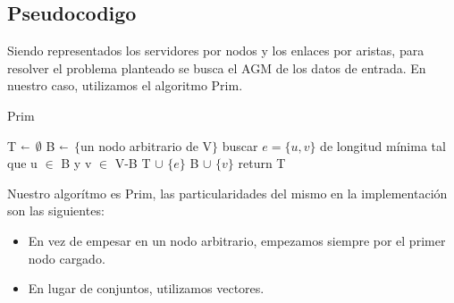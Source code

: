 \subsection{Pseudocodigo}

Siendo representados los servidores por nodos y los enlaces por aristas, para resolver el problema planteado se busca el AGM de los datos de entrada. En nuestro caso, utilizamos el algoritmo Prim.


\begin{algorithm}[H]
\caption{Prim}\label{ej2}
\begin{algorithmic}[1]
	\State T  $\shortleftarrow$ $\emptyset$
	\State B $\shortleftarrow$ $\{$un nodo arbitrario de V$\}$
		\State buscar $e=\{u,v\}$ de longitud mínima tal que u $\in$ B y v $\in$ V-B
		\State T $\cup$ $\{e\}$
		\State B $\cup$ $\{v\}$
	\EndWhile
	\State return T
\EndProcedure
\end{algorithmic}
\end{algorithm}


Nuestro algorítmo es Prim, las particularidades del mismo en la implementación son las siguientes:

\begin{itemize}
\item En vez de empesar en un nodo arbitrario, empezamos siempre por el primer nodo cargado.
\item En lugar de conjuntos, utilizamos vectores.
\end{itemize}

